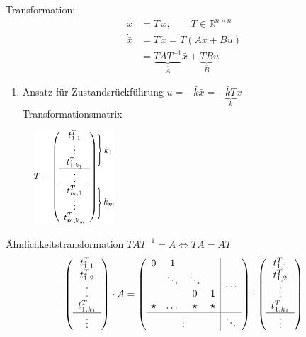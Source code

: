 \documentclass[ngerman]{tudscrreprt}
\begin{document}
Transformation: \begin{align*} \bar x &= T\,x ,\qquad T\in \mathbb{R}^{n\times n}\\ 
\dot{\bar{x}} & = T\,\dot x = T(Ax + Bu)\\ 
&= \underbrace{TAT^{-1}}_{\bar A} \bar x + \underbrace{TB}_{\bar B}u\end{align*} 
\begin{enumerate}
\item Ansatz für Zustandsrückführung $ u = -\bar k \bar x = -\underbrace{\bar k T}_{k} x$\\ 
Transformationsmatrix 
\end{enumerate}
\begin{figure}[H]
\centering
\def\svgwidth{200pt} 
  \includegraphics[width=3cm]{Tmatrix.pdf}
\end{figure} Ähnlichkeitstransformation $TAT^{-1} = \bar A \iff TA = \bar A T$
\begin{align*}
\left(
\begin{array}{ c }
t_{1,1}^T \\ t_{1,2}^T \\ \vdots\\ t_{1,k_1}^T\\ \hline \vdots
\end{array}\right)\cdot A = \left(
\begin{array}{ c | c }
\begin{matrix}
0&1 && \\ 
& \ddots&\ddots&\\
&&0&1\\ 
\star&\dots&\star& \star
\end{matrix}& \dots \\ \hline \vdots& \ddots
\end{array}
\right)\cdot \left(
\begin{array}{ c }
t_{1,1}^T \\ t_{1,2}^T \\ \vdots\\ t_{1,k_1}^T\\ \hline \vdots
\end{array}\right)
\end{align*}
\end{document}
